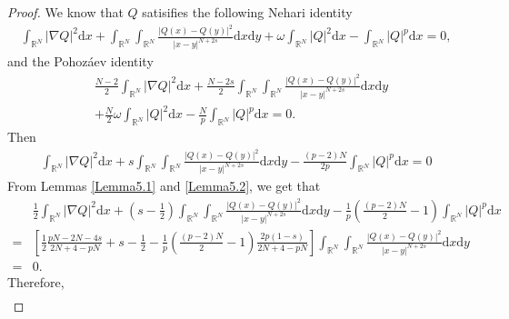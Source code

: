 \documentclass[12pt,a4paper,reqno]{amsart}
\numberwithin{equation}{section}
\begin{document}
\begin{proof}
We know that
$Q$ satisifies the following Nehari identity
\begin{equation*}
\begin{aligned}
\int_{\mathbb{R}^{N}}
|\nabla Q|^{2}
\mathrm{d}x
+
\int_{\mathbb{R}^{N}}
\int_{\mathbb{R}^{N}}
\frac{|Q(x)-Q(y)|^{2}}{|x-y|^{N+2s}}
\mathrm{d}x
\mathrm{d}y
+
\omega
\int_{\mathbb{R}^{N}}
|Q|^{2}
\mathrm{d}x
-
\int_{\mathbb{R}^{N}}
|Q|^{p}
\mathrm{d}x
=0,
\end{aligned}
\end{equation*}
and the Pohoz\'{a}ev identity
\begin{equation*}
\begin{aligned}
&\frac{N-2}{2}
\int_{\mathbb{R}^{N}}
|\nabla Q|^{2}
\mathrm{d}x
+\frac{N-2s}{2}
\int_{\mathbb{R}^{N}}
\int_{\mathbb{R}^{N}}
\frac{|Q(x)-Q(y)|^{2}}{|x-y|^{N+2s}}
\mathrm{d}x
\mathrm{d}y\\
&+
\frac{N}{2}
\omega
\int_{\mathbb{R}^{N}}
|Q|^{2}
\mathrm{d}x
-\frac{N}{p}
\int_{\mathbb{R}^{N}}
|Q|^{p}
\mathrm{d}x
=0.
\end{aligned}
\end{equation*}
Then
\begin{equation*}
\begin{aligned}
\int_{\mathbb{R}^{N}}
|\nabla Q|^{2}
\mathrm{d}x
+s
\int_{\mathbb{R}^{N}}
\int_{\mathbb{R}^{N}}
\frac{|Q(x)-Q(y)|^{2}}{|x-y|^{N+2s}}
\mathrm{d}x
\mathrm{d}y
-\frac{(p-2)N}{2p}
\int_{\mathbb{R}^{N}}
|Q|^{p}
\mathrm{d}x=0
\end{aligned}
\end{equation*}
From Lemmas \ref{Lemma5.1} and \ref{Lemma5.2},
we get that
\begin{equation*}
\begin{aligned}
&\frac{1}{2}
\int_{\mathbb{R}^{N}}
|\nabla Q|^{2}
\mathrm{d}x
+(s-\frac{1}{2})
\int_{\mathbb{R}^{N}}
\int_{\mathbb{R}^{N}}
\frac{|Q(x)-Q(y)|^{2}}{|x-y|^{N+2s}}
\mathrm{d}x
\mathrm{d}y
-\frac{1}{p}
(\frac{(p-2)N}{2}-1)
\int_{\mathbb{R}^{N}}
|Q|^{p}
\mathrm{d}x\\
=&
\left[\frac{1}{2}\frac{pN-2N-4s}{2N+4-pN}
+s-\frac{1}{2}
-\frac{1}{p}
(\frac{(p-2)N}{2}-1)
\frac{2p(1-s)}{2N+4-pN}\right]
\int_{\mathbb{R}^{N}}
\int_{\mathbb{R}^{N}}
\frac{|Q(x)-Q(y)|^{2}}{|x-y|^{N+2s}}
\mathrm{d}x
\mathrm{d}y\\
=&0.
\end{aligned}
\end{equation*}
Therefore,
\begin{equation*}
\begin{aligned}

\end{aligned}
\end{equation*}
\end{proof}
\end{document}
